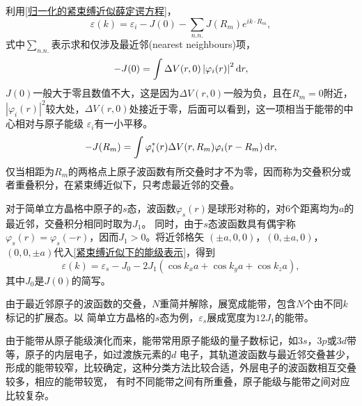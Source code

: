                 利用\autoref{归一化的紧束缚近似薛定谔方程}，
                \begin{equation}
                    \varepsilon(k)=\varepsilon_i-J(0)-\sum_{n. n.}J(R_m)e^{ik\cdot R_m}\label{紧束缚近似下的能级表示},
                \end{equation}
                式中$\sum_{n. n.}$表示求和仅涉及最近邻(nearest neighbours)项，
                \begin{equation}
                    -J(0)=\int\Delta V(r,0)\left|\varphi_i(r)\right|^2\mathop{}\!\mathrm{d} r,
                \end{equation}
                $J(0)$一般大于零且数值不大，这是因为$\Delta V(r,0)$一般为负，且在$R_m=0$附近，
                $|\varphi_i(r)|^2$较大处，$\Delta V(r,0)$处接近于零，后面可以看到，这一项相当于能带的中心相对与原子能级
                $\varepsilon_i$有一小平移。
                \begin{equation}
                    -J(R_m)=\int\varphi_i^*(r)\Delta V(r,R_m)\varphi_i(r-R_m)\mathop{}\!\mathrm{d} r\label{交叠积分},
                \end{equation}
                仅当相距为$R_m$的两格点上原子波函数有所交叠时才不为零，因而称为交叠积分或者重叠积分，在紧束缚近似下，只考虑最近邻的交叠。

                对于简单立方晶格中原子的$s$态，波函数$\varphi_s(r)$是球形对称的，对6个距离均为$a$的最近邻，交叠积分相同时取为$J_1$。
                同时，由于$s$态波函数具有偶宇称$\varphi_s(r)=\varphi_s(-r)$，因而$J_1>0$。将近邻格矢
                $(\pm a,0,0)$，$(0,\pm a,0)$，$(0,0,\pm a)$代入\autoref{紧束缚近似下的能级表示}，得到
                \begin{equation}
                    \varepsilon(k)=\varepsilon_s-J_0-2J_1\left( \cos{k_xa}+\cos{k_ya}+\cos{k_za} \right)\label{紧束缚近似下的能带和格矢关系},
                \end{equation}
                其中$J_0$是$J(0)$的简写。

                由于最近邻原子的波函数的交叠，$N$重简并解除，展宽成能带，包含$N$个由不同$k$标记的扩展态。以
                简单立方晶格的$s$态为例，$\varepsilon_s$展成宽度为$12J_1$的能带。

                由于能带从原子能级演化而来，能带常用原子能级的量子数标记，如$3s$，$3p$或$3d$带等，原子的内层电子，如过渡族元素的$d$
                电子，其轨道波函数与最近邻交叠甚少，形成的能带较窄，比较确定，这种分类方法比较合适，外层电子的波函数相互交叠较多，相应的能带较宽，
                有时不同能带之间有所重叠，原子能级与能带之间对应比较复杂。

